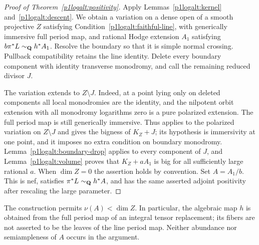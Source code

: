 \begin{proof}[Proof of Theorem~\ref{p1logalt:positivity}]
Apply Lemmas~\ref{p1logalt:kernel} and~\ref{p1logalt:descent}.  We obtain a
variation on a dense open of a smooth projective $Z$ satisfying
Condition~\eqref{p1logalt:faithful-line}, with generically immersive full period map,
and rational Hodge extension $A_1$ satisfying
$b\pi^*L\sim_{\mathbf Q}h^*A_1$.  Resolve the boundary so that it is simple normal crossing.  Pullback
compatibility retains the line identity.  Delete every boundary component with identity transverse
monodromy, and call the remaining reduced divisor $J$.

The variation extends to $Z\setminus J$.  Indeed, at a point lying only
on deleted components all local monodromies are the identity, and the
nilpotent orbit extension with all monodromy logarithms zero is a pure
polarized extension.  The full period map is still generically immersive.
Thus \cite[Theorem~1.1 and Remark~1.2(1)]{BrunebarbeCadorel} applies
to the polarized variation on $Z\setminus J$ and gives the bigness of
$K_Z+J$; its hypothesis is immersivity at one point, and it imposes no
extra condition on boundary monodromy.
Lemma~\ref{p1logalt:boundary-drop} applies to every component of $J$, and
Lemma~\ref{p1logalt:volume} proves that $K_Z+aA_1$ is big for all sufficiently
large rational $a$.  When $\dim Z=0$ the assertion holds by convention.
Set $A=A_1/b$.  This is nef, satisfies
$\pi^*L\sim_{\mathbf Q}h^*A$, and has the same asserted adjoint positivity
after rescaling the large parameter.
\end{proof}

\begin{remark}\label{p1logalt:no-abundance}
The construction permits $\nu(A)<\dim Z$.  In particular, the algebraic
map $h$ is obtained from the full period map of an integral tensor
replacement; its fibers are not asserted to be the leaves of the line
period map.  Neither abundance nor semiampleness of $A$ occurs in the
argument.
\end{remark}
